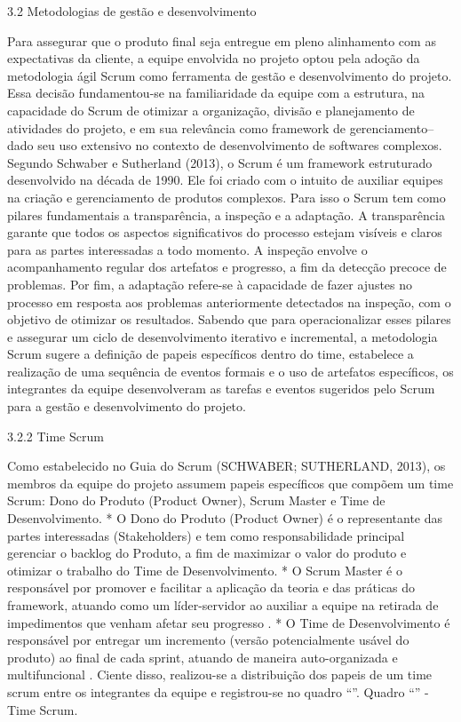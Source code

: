 3.2 Metodologias de gestão e desenvolvimento


Para assegurar que o produto final seja entregue em pleno alinhamento com as expectativas da cliente, a equipe envolvida no projeto optou pela adoção da metodologia ágil Scrum como ferramenta de gestão e desenvolvimento do projeto. Essa decisão fundamentou-se na familiaridade da equipe com a estrutura, na capacidade do Scrum de otimizar a organização, divisão e planejamento de atividades do projeto, e em sua relevância como framework de gerenciamento– dado seu uso extensivo no contexto de desenvolvimento de softwares complexos.
Segundo Schwaber e Sutherland (2013), o Scrum é um framework estruturado desenvolvido na década de 1990. Ele foi criado com o intuito de auxiliar equipes na criação e gerenciamento de produtos complexos. Para isso o Scrum tem como pilares fundamentais a transparência, a inspeção e a adaptação. A transparência garante que todos os aspectos significativos do processo estejam visíveis e claros para as partes interessadas a todo momento. A inspeção envolve o acompanhamento regular dos artefatos e progresso, a fim da detecção precoce de problemas. Por fim, a adaptação refere-se à capacidade de fazer ajustes no processo  em resposta aos problemas anteriormente detectados na inspeção, com o objetivo de otimizar os resultados.
Sabendo que para operacionalizar esses pilares e assegurar um ciclo de desenvolvimento iterativo e incremental, a metodologia Scrum sugere a definição de papeis específicos dentro do time, estabelece a realização de uma sequência de eventos formais e o uso de artefatos específicos, os integrantes da equipe desenvolveram as tarefas e eventos sugeridos pelo Scrum para a gestão e desenvolvimento do projeto.


3.2.2 Time Scrum


        Como estabelecido no Guia do Scrum (SCHWABER; SUTHERLAND, 2013), os membros da equipe do projeto assumem papeis específicos que compõem um time Scrum: Dono do Produto (Product Owner), Scrum Master e Time de Desenvolvimento. 
* O Dono do Produto (Product Owner) é o representante das partes interessadas (Stakeholders) e tem como responsabilidade principal gerenciar o backlog do Produto, a fim de maximizar o valor do produto e otimizar o trabalho do Time de Desenvolvimento. 
* O Scrum Master é o responsável por promover e facilitar a aplicação da teoria e das práticas do framework, atuando como um líder-servidor ao auxiliar a equipe na retirada de impedimentos que venham afetar seu progresso . 
* O Time de Desenvolvimento é responsável por entregar um incremento (versão potencialmente usável do produto) ao final de cada sprint, atuando de maneira auto-organizada e multifuncional . 
Ciente disso, realizou-se a distribuição dos papeis de um time scrum entre os integrantes da equipe e registrou-se no quadro “”.
                Quadro “” - Time Scrum.




